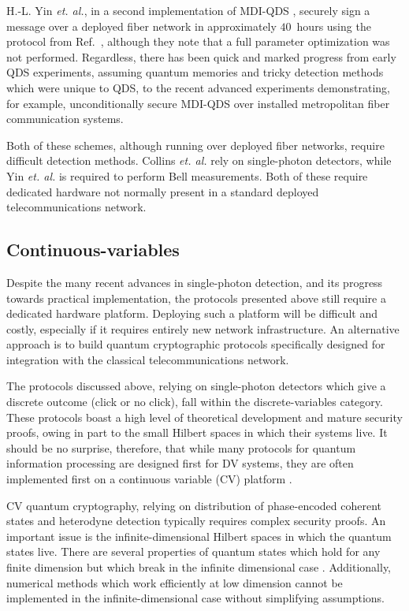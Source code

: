 H.-L. Yin \emph{et. al.}, in a second implementation of MDI-QDS \cite{Yin2017}, securely sign a message over a deployed fiber network in approximately $40$~hours using the protocol from Ref.~\cite{Puthoor2016}, although they note that a full parameter optimization was not performed. Regardless, there has been quick and marked progress from early QDS experiments, assuming quantum memories and tricky detection methods which were unique to QDS, to the recent advanced experiments demonstrating, for example, unconditionally secure MDI-QDS over installed metropolitan fiber communication systems.

Both of these schemes, although running over deployed fiber networks, require difficult detection methods. Collins \emph{et. al.} \cite{Collins2016} rely on single-photon detectors, while Yin \emph{et. al.} \cite{Yin2017} is required to perform Bell measurements. Both of these require dedicated hardware not normally present in a standard deployed telecommunications network.


\subsection{Continuous-variables}


Despite the many recent advances in single-photon detection, and its progress towards practical implementation, the protocols presented above still require a dedicated hardware platform. Deploying such a platform will be difficult and costly, especially if it requires entirely new network infrastructure. An alternative approach is to build quantum cryptographic protocols specifically designed for integration with the classical telecommunications network. 

The protocols discussed above, relying on single-photon detectors which give a discrete outcome (click or no click), fall within the discrete-variables category. These protocols boast a high level of theoretical development and mature security proofs, owing in part to the small Hilbert spaces in which their systems live. It should be no surprise, therefore, that while many protocols for quantum information processing are designed first for DV systems, they are often implemented first on a continuous variable (CV) platform \cite{Braunstein1998}.

CV quantum cryptography, relying on distribution of phase-encoded coherent states and heterodyne detection typically requires complex security proofs. An important issue is the infinite-dimensional Hilbert spaces in which the quantum states live. There are several properties of quantum states which hold for any finite dimension but which break in the infinite dimensional case \cite{Ranade2015}.  Additionally, numerical methods which work efficiently at low dimension \cite{Coles2016} cannot be implemented in the infinite-dimensional case without simplifying assumptions.

